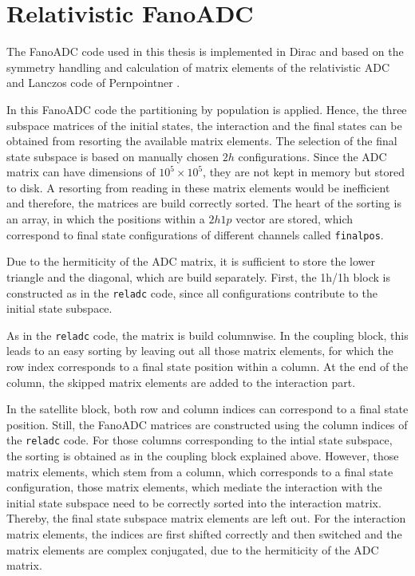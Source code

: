 \section{Relativistic FanoADC}

The FanoADC code used in this thesis is implemented in Dirac \cite{DIRAC13}
and based on the symmetry handling and calculation of matrix elements of
the relativistic \ac{ADC} and Lanczos code of Pernpointner
\cite{Pernpointner04_1,Pernpointner04_2}.

In this FanoADC code the partitioning by population is applied. Hence, the
three subspace matrices of the initial states, the interaction and the final
states can be obtained from resorting the available matrix elements. The
selection of the final state subspace is based on manually chosen $2h$
configurations.
Since the \ac{ADC} matrix can have dimensions
of $10^5\times 10^5$, they are not kept
in memory but stored to disk. A resorting from reading in these matrix elements
would be inefficient and therefore, the matrices are build correctly
sorted. The heart of the sorting is an array, in which the positions within
a $2h1p$ vector are stored, which correspond to final state configurations
of different channels called \verb|finalpos|.

Due to the hermiticity of the \ac{ADC} matrix, it is sufficient to store the
lower triangle and the diagonal, which are build separately. First, the
1h/1h block is constructed as in the \verb|reladc| code, since all
configurations contribute to the initial state subspace.

As in the \verb|reladc| code, the matrix is build columnwise.
In the
coupling block, this leads to an easy sorting by leaving out all those matrix
elements, for which the row index corresponds to a final state position within
a column.
At the end of the column, the skipped matrix elements are added to the
interaction part.

In the satellite block, both row and column indices can correspond to a
final state position. Still, the FanoADC matrices are constructed using
the column indices of the \verb|reladc| code. For those columns corresponding
to the intial state subspace, the sorting is obtained as in the coupling block
explained above. However, those matrix elements,
which stem from a column, which corresponds to a final state configuration,
those matrix elements, which mediate the interaction with the initial state
subspace need to be correctly sorted into the interaction matrix. Thereby,
the final state subspace matrix elements are left out. For the
interaction matrix elements, the indices are first shifted correctly and
then switched and the matrix elements are complex conjugated, due to the
hermiticity of the \ac{ADC} matrix.

